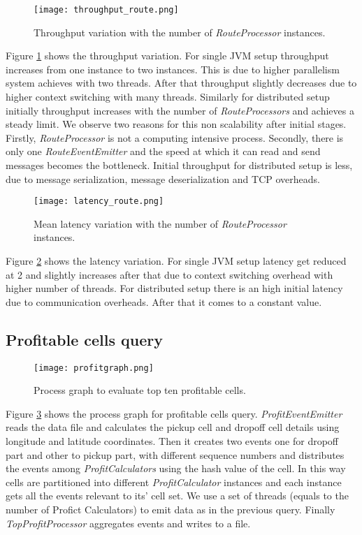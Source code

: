 \begin{figure}[!t]
        \centering
        \texttt{[image: throughput\_route.png]}
        \caption{Throughput variation with the number of \textit{RouteProcessor} instances.}
        \label{throughput_route}
\end{figure}

Figure \ref{throughput_route} shows the throughput variation. For single JVM setup throughput increases from one instance to two instances. This is due to higher parallelism system achieves with two threads. After that throughput slightly decreases due to higher context switching with many threads. Similarly for distributed setup initially throughput increases with the number of   \textit{RouteProcessors} and achieves a steady limit. We observe two reasons for this non scalability after initial stages. Firstly, \textit{RouteProcessor} is not a computing intensive process. Secondly, there is only one \textit{RouteEventEmitter} and the speed at which it can read and send messages becomes the bottleneck. Initial throughput for distributed setup is less, due to message serialization, message deserialization and TCP overheads. 

\begin{figure}[!t]
        \centering
        \texttt{[image: latency\_route.png]}
        \caption{Mean latency variation with the number of \textit{RouteProcessor} instances.}
        \label{latency_route}
\end{figure}

Figure \ref{latency_route} shows the latency variation. For single JVM setup latency get reduced at 2 and slightly increases after that due to context switching overhead with higher number of threads. For distributed setup there is an high initial latency due to communication overheads. After that it comes to a constant value. 

\subsection{Profitable cells query}

\begin{figure}[!t]
        \centering
        \texttt{[image: profitgraph.png]}
        \caption{Process graph to evaluate top ten profitable cells.}
        \label{profictgraph}
\end{figure}

Figure \ref{profictgraph} shows the process graph for profitable cells query. \textit{ProfitEventEmitter} reads the data file and calculates the pickup cell and dropoff cell details using longitude and latitude coordinates. Then it creates two events one for dropoff part and other to pickup part, with different sequence numbers and distributes the events among \textit{ProfitCalculators} using the hash value of the cell. In this way cells are partitioned into different \textit{ProfitCalculator} instances and each instance gets all the events relevant to its' cell set. We use a set of threads (equals to the number of Profict Calculators) to emit data as in the previous query. Finally \textit{TopProfitProcessor} aggregates events and writes to a file. 

